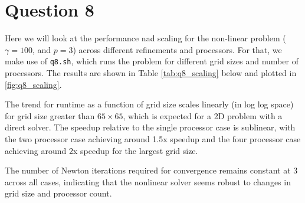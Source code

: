 \documentclass[12pt]{article}
\begin{document}
\newpage
\section{Question 8}
Here we will look at the performance nad scaling for the non-linear problem ($\gamma = 100$, and $p=3$) across different refinements and processors. For that, we make use of \texttt{q8.sh}, which runs the problem for different grid sizes and number of processors. The results are shown in Table \ref{tab:q8_scaling} below and plotted in \ref{fig:q8_scaling}.


The trend for runtime as a function of grid size scales linearly (in log log space) for grid size greater than $65 \times 65$, which is expected for a 2D problem with a direct solver. The speedup relative to the single processor case is sublinear, with the two processor case achieving around 1.5x speedup and the four processor case achieving around 2x speedup for the largest grid size. 

The number of Newton iterations required for convergence remains constant at 3 across all cases, indicating that the nonlinear solver seems robust to changes in grid size and processor count. 
\end{document}
